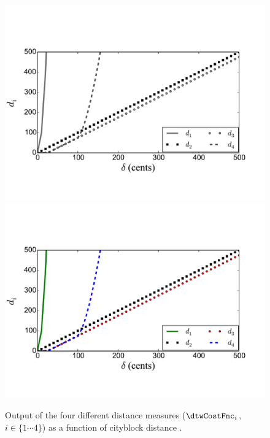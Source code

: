 \begin{figure}
	\begin{center}
		\ifdefined\PRINTVER
			\includegraphics[width=\figSizeEighty]{ch06_patterns/figures/discovery/distances_BW.pdf}
		\else
			\includegraphics[width=\figSizeEighty]{ch06_patterns/figures/discovery/distances.pdf}
		\fi
	\end{center}
	\caption[Illustration of output of different distance measures]{Output of the four different distance measures ($\dtwCostFnc_i$, $i \in \lbrace 1\cdots4 \rbrace$) as a function of cityblock distance \pitchDiff.}
	\label{fig:Distances_DTW_discovery}
\end{figure}

